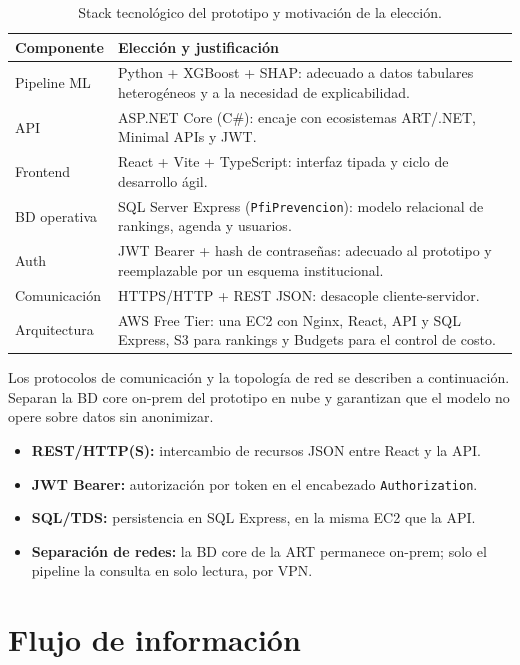 \begin{table}[htbp]
	\centering
	\caption{Stack tecnol\'ogico del prototipo y motivaci\'on de la elecci\'on. \fuentepropia}
	\label{tab:stack}
	\begin{tabular}{@{}p{}p{}@{}}
		\hline
		\textbf{Componente} & \textbf{Elecci\'on y justificaci\'on} \\
		\hline
		Pipeline ML & Python + XGBoost + SHAP: adecuado a datos tabulares heterog\'eneos y a la necesidad de explicabilidad. \\
		API & ASP.NET Core (C\#): encaje con ecosistemas ART/.NET, Minimal APIs y JWT. \\
		Frontend & React + Vite + TypeScript: interfaz tipada y ciclo de desarrollo \'agil. \\
		BD operativa & SQL Server Express (\texttt{PfiPrevencion}): modelo relacional de rankings, agenda y usuarios. \\
		Auth & JWT Bearer + hash de contrase\~nas: adecuado al prototipo y reemplazable por un esquema institucional. \\
		Comunicaci\'on & HTTPS/HTTP + REST JSON: desacople cliente-servidor. \\
		Arquitectura & AWS Free Tier: una EC2 con Nginx, React, API y SQL Express, S3 para rankings y Budgets para el control de costo. \\
		\hline
	\end{tabular}
\end{table}

Los protocolos de comunicaci\'on y la topolog\'ia de red se describen a continuaci\'on.
Separan la BD core on-prem del prototipo en nube y garantizan que el modelo no opere sobre datos sin anonimizar.

\begin{itemize}
	\item \textbf{REST/HTTP(S):} intercambio de recursos JSON entre React y la API.
	\item \textbf{JWT Bearer:} autorizaci\'on por token en el encabezado \texttt{Authorization}.
	\item \textbf{SQL/TDS:} persistencia en SQL Express, en la misma EC2 que la API.
	\item \textbf{Separaci\'on de redes:} la BD core de la ART permanece on-prem; solo el pipeline la consulta en solo lectura, por VPN.
\end{itemize}

\section{Flujo de informaci\'on}

